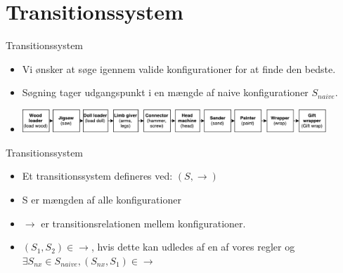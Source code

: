 \section{Transitionssystem}
\begin{frame}{Transitionssystem}{}
  \begin{itemize}
  \item<1-> Vi ønsker at søge igennem valide konfigurationer for at finde den bedste.
  \item<2-> Søgning tager udgangspunkt i en mængde af naive konfigurationer $S_{naive}$.
  \item<3->
  \includegraphics[width=0.9\textwidth]{figures/trivialexample.pdf}		    
    \end{itemize}
\end{frame}

\begin{frame}{Transitionssystem}{}
  \begin{itemize}
  \item<1-> Et transitionssystem defineres ved: $(S, \rightarrow)$
  \item<2-> S er mængden af alle konfigurationer
  \item<3-> $\rightarrow$ er transitionsrelationen mellem konfigurationer. 
  \item<4-> $(S_1,S_2) \in \rightarrow$, hvis dette kan udledes af en af vores regler og  $\exists S_{nx} \in S_{naive},  (S_{nx}, S_1) \in \rightarrow$
\end{itemize}    
\end{frame}
